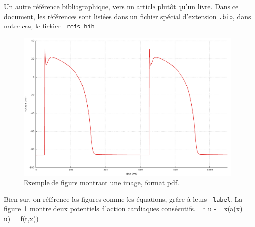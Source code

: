 \documentclass[a4paper,12pt,twoside]{report}
\begin{document}
Un autre référence bibliographique, vers un article \cite{rush_larsen.1978}
plutôt qu'un livre. Dans ce document, les références sont listées dans un
fichier spécial d'extension {\tt .bib}, dans notre cas, le fichier {\tt
  refs.bib}.
\begin{figure}[htpb!]
  \centering
  \includegraphics[width=0.8\linewidth]{V_tnnp.pdf}
  \caption{Exemple de figure montrant une image, format pdf.}
  \label{fig:exemple}
\end{figure}

Bien sur, on référence les figures comme les équations, grâce à leurs {\tt
  label}. La figure~\ref{fig:exemple} montre deux potentiels d'action cardiaques
consécutifs.
\partial_t u - \partial_x(a(x) \partial u) = f(t,x))
\cleardoublepage


\end{document}
